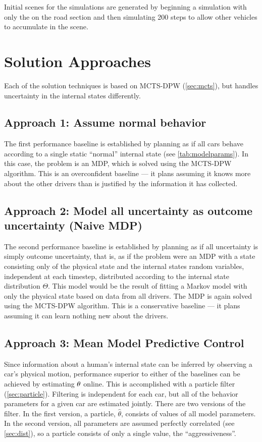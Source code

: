 Initial scenes for the simulations are generated by beginning a simulation with only the \av{} on the road section and then simulating 200 steps to allow other vehicles to accumulate in the scene.

\section{Solution Approaches} \label{sec:solution}

Each of the solution techniques is based on MCTS-DPW (\cref{sec:mcts}), but handles uncertainty in the internal states differently.

\subsection{Approach 1: Assume normal behavior}

The first performance baseline is established by planning as if all cars behave according to a single static ``normal'' internal state (see \cref{tab:modelparams}).
In this case, the problem is an MDP, which is solved using the MCTS-DPW algorithm.
This is an overconfident baseline --- it plans assuming it knows more about the other drivers than is justified by the information it has collected.

\subsection{Approach 2: Model all uncertainty as outcome uncertainty (Naive MDP)}

The second performance baseline is established by planning as if all uncertainty is simply outcome uncertainty, that is, as if the problem were an MDP with a state consisting only of the physical state and the internal states random variables, independent at each timestep, distributed according to the internal state distribution $\Theta$. 
This model would be the result of fitting a Markov model with only the physical state based on data from all drivers.
The MDP is again solved using the MCTS-DPW algorithm.
This is a conservative baseline --- it plans assuming it can learn nothing new about the drivers.

\subsection{Approach 3: Mean Model Predictive Control} \label{sec:mpc}

Since information about a human's internal state can be inferred by observing a car's physical motion, performance superior to either of the baselines can be achieved by estimating $\theta$ online.
This is accomplished with a particle filter (\cref{sec:particle}).
Filtering is independent for each car, but all of the behavior parameters for a given car are estimated jointly.
There are two versions of the filter.
In the first version, a particle, $\hat{\theta}$, consists of values of all model parameters.
In the second version, all parameters are assumed perfectly correlated (see \cref{sec:dist}), so a particle consists of only a single value, the ``aggressiveness''.

